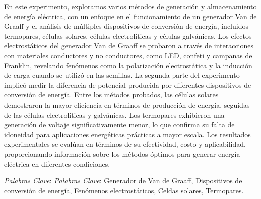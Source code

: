 \documentclass[article,12pt]{elsarticle}
\begin{document}
En este experimento, exploramos varios métodos de generación y almacenamiento de energía eléctrica, con un enfoque en el funcionamiento de un generador Van de Graaff y el análisis de múltiples dispositivos de conversión de energía, incluidos termopares, células solares, células electrolíticas y células galvánicas. Los efectos electrostáticos del generador Van de Graaff se probaron a través de interacciones con materiales conductores y no conductores, como LED, confeti y campanas de Franklin, revelando fenómenos como la polarización electrostática y la inducción de carga cuando se utilizó en las semillas. La segunda parte del experimento implicó medir la diferencia de potencial producida por diferentes dispositivos de conversión de energía. Entre los métodos probados, las células solares demostraron la mayor eficiencia en términos de producción de energía, seguidas de las células electrolíticas y galvánicas. Los termopares exhibieron una generación de voltaje significativamente menor, lo que confirma su falta de idoneidad para aplicaciones energéticas prácticas a mayor escala. Los resultados experimentales se evalúan en términos de su efectividad, costo y aplicabilidad, proporcionando información sobre los métodos óptimos para generar energía eléctrica en diferentes condiciones.

\noindent \textit{Palabras Clave}: \textit{Palabras Clave}: Generador de Van de Graaff, Dispositivos de conversión de energía, Fenómenos electrostáticos, Celdas solares, Termopares.\\ \hline
\end{document}
